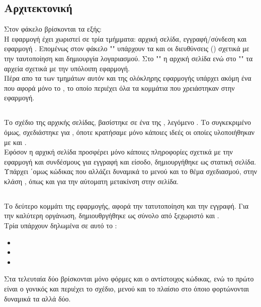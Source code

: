 \subsection*{Αρχιτεκτονική}
\pSpace Στον φάκελο  βρίσκονται τα εξής:\\
\pSpace Η εφαρμογή έχει χωριστεί σε τρία τμήμματα: αρχική σελίδα, εγγραφή/σύνδεση και εφαρμογή . Επομένως στον φάκελο "" υπάρχουν τα  και οι διευθύνσεις () σχετικά με την ταυτοποίηση και δημιουργία λογαριασμού. Στο "" η αρχική σελίδα ενώ στο "" τα αρχεία σχετικά με την υπόλοιπη εφαρμογή.\\
\pSpace Πέρα απο τα  των τμημάτων αυτόν και της ολόκληρης εφαρμογής υπάρχει ακόμη ένα που αφορά μόνο το , το οποίο περιέχει όλα τα κομμάτια που χρειάστηκαν στην εφαρμογή.

\subsection*{}
\pSpace Το σχέδιο της αρχικής σελίδας, βασίστηκε σε ένα  της , λεγόμενο . Το συγκεκριμένο όμως, σχεδιάστηκε για , όποτε κρατήσαμε μόνο κάποιες ιδεές οι οποίες υλοποιήθηκαν με  και .\\
\pSpace Εφόσον η αρχική σελίδα προσφέρει μόνο κάποιες πληροφορίες σχετικά με την εφαρμογή και συνδέσμους για εγγραφή και είσοδο, δημιουργήθηκε ως στατική σελίδα. Υπάρχει ΄ομως κώδικας που αλλάζει δυναμικά το μενού και το θέμα σχεδιασμού, στην κλάση , όπως και για την αύτοματη μετακίνση στην σελίδα.

\subsection*{}
\pSpace Το δεύτερο κομμάτι της εφαρμογής, αφορά την τατυτοποίηση και την εγγραφή. Για την καλύτερη οργάνωση, δημιουθργήθηκε ως σύνολο από ξεχωριστό  και .\\
\pSpace Τρία  υπάρχουν δηλωμένα σε αυτό το :
\begin{itemize}
	\item {}
	\item {}
	\item {}
\end{itemize}
\pSpace Στα τελευταία δύο βρίσκονται μόνο φόρμες και ο αντίστοιχος κώδικας, ενώ το πρώτο είναι ο γονικός  και περιέχει το σχέδιο, μενού και το πλαίσιο στο όποιο φορτώνονται δυναμικά τα αλλά δύο.

